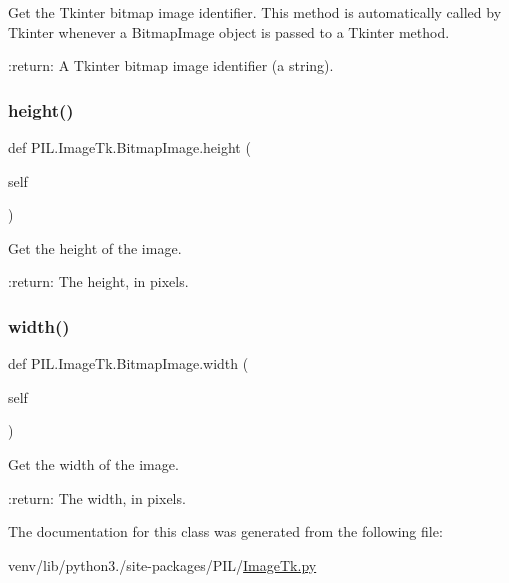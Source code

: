 \begin{DoxyVerb}Get the Tkinter bitmap image identifier.  This method is automatically
called by Tkinter whenever a BitmapImage object is passed to a Tkinter
method.

:return: A Tkinter bitmap image identifier (a string).
\end{DoxyVerb}
 \mbox{\label{classPIL_1_1ImageTk_1_1BitmapImage_ab1eac0fbb2820554a79a4a5ddc842f8b}} 
\subsubsection{\texorpdfstring{height()}{height()}}
{\footnotesize\ttfamily def P\+I\+L.\+Image\+Tk.\+Bitmap\+Image.\+height (\begin{DoxyParamCaption}\item[{}]{self }\end{DoxyParamCaption})}

\begin{DoxyVerb}Get the height of the image.

:return: The height, in pixels.
\end{DoxyVerb}
 \mbox{\label{classPIL_1_1ImageTk_1_1BitmapImage_ad50b3ca8484f81ea9f5270970e976a45}} 
\subsubsection{\texorpdfstring{width()}{width()}}
{\footnotesize\ttfamily def P\+I\+L.\+Image\+Tk.\+Bitmap\+Image.\+width (\begin{DoxyParamCaption}\item[{}]{self }\end{DoxyParamCaption})}

\begin{DoxyVerb}Get the width of the image.

:return: The width, in pixels.
\end{DoxyVerb}
 

The documentation for this class was generated from the following file\+:\begin{DoxyCompactItemize}
\item 
venv/lib/python3./site-\/packages/\+P\+I\+L/\hyperlink{ImageTk_8py}{Image\+Tk.\+py}\end{DoxyCompactItemize}
